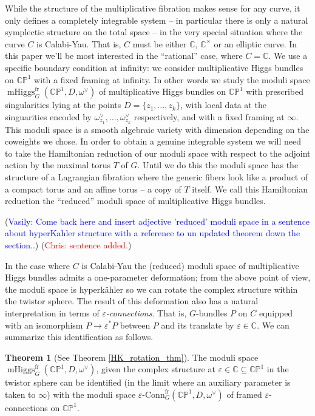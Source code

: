 \documentclass[11pt, oneside, reqno]{amsart}
\theoremstyle{definition} \newtheorem{definition}{Definition}[section]
\newtheorem{theorem}[definition]{Theorem}
\theoremstyle{definition} \newtheorem{remark}[definition]{Remark}
\theoremstyle{definition} \newtheorem{remarks}[definition]{Remarks}
\theoremstyle{definition} \newtheorem{question}[definition]{Question}
\theoremstyle{definition} \newtheorem*{note}{Note}
\theoremstyle{definition} \newtheorem{example}[definition]{Example}
\theoremstyle{definition} \newtheorem{examples}[definition]{Examples}
\newcommand{\bb}[1]{\mathbb{#1}}
\newcommand{\CC}{\mathbb{C}}
\newcommand{\eps}{\varepsilon}
\newcommand{\sub}{\subseteq}
\DeclareMathOperator{\mhiggs}{mHiggs}
\newcommand{\epsconn}{\varepsilon\text{-Conn}}
\newcommand{\chris}[1]{(\textcolor{red}{Chris: #1})}
\newcommand{\vasily}[1]{(\textcolor{blue}{Vasily: #1})}
\begin{document}
 While the structure of the multiplicative fibration makes sense for any curve, it only defines a completely integrable system -- in particular there is only a natural symplectic structure on the total space -- in the very special situation where the curve $C$ is Calabi-Yau.  That is, $C$ must be either $\CC$, $\CC^\times$ or an elliptic curve.  In this paper we'll be most interested in the ``rational'' case, where $C = \CC$.  We use a specific boundary condition at infinity: we consider multiplicative Higgs bundles on $\bb{CP}^1$ with a fixed framing at infinity.  In other words we study the moduli space $\mhiggs^{\text{fr}}_G(\bb{CP}^1,D,\omega^\vee)$ of multiplicative Higgs bundles on $\bb{CP}^1$ with prescribed singularities lying at the points $D = \{z_1, \ldots, z_k\}$, with local data at the singuarities encoded by $\omega_{z_1}^\vee, \ldots, \omega_{z_k}^\vee$ respectively, and with a fixed framing at $\infty$.  This moduli space is a smooth algebraic variety with dimension depending on the coweights we chose.  In order to obtain a genuine integrable system we will need to take the Hamiltonian reduction of our moduli space with respect to the adjoint action by the maximal torus $T$ of $G$.  Until we do this the moduli space has the structure of a Lagrangian fibration where the generic fibers look like a product of a compact torus and an affine torus -- a copy of $T$ itself.  We call this Hamiltonian reduction the ``reduced'' moduli space of multiplicative Higgs bundles.

 \vasily{Come back here and insert adjective 'reduced' moduli space
   in a sentence about hyperKahler structure with a reference to
   un updated theorem down the section..} \chris{sentence added.}
 
 In the case where $C$ is Calabi-Yau the (reduced) moduli space of multiplicative Higgs bundles admits a one-parameter deformation; from the above point of view, the moduli space is hyperk\"ahler so we can rotate the complex structure within the twistor sphere.  The result of this deformation also has a natural interpretation in terms of \emph{$\eps$-connections}.  That is, $G$-bundles $P$ on $C$ equipped with an isomorphism $P \to \eps^*P$ between $P$ and its translate by $\eps \in \CC$.  We can summarize this identification as follows.
 
 \begin{theorem} [See Theorem \ref{HK_rotation_thm}]
 The moduli space $\mhiggs^{\text{fr}}_G(\bb{CP}^1,D,\omega^\vee)$, given the complex structure at $\eps \in \CC \sub \bb{CP}^1$ in the twistor sphere can be identified (in the limit where an auxiliary parameter is taken to $\infty$) with the moduli space $\epsconn^{\text{fr}}_G(\bb{CP}^1,D,\omega^\vee)$ of framed $\eps$-connections on $\bb{CP}^1$.
 \end{theorem}
\end{document}
